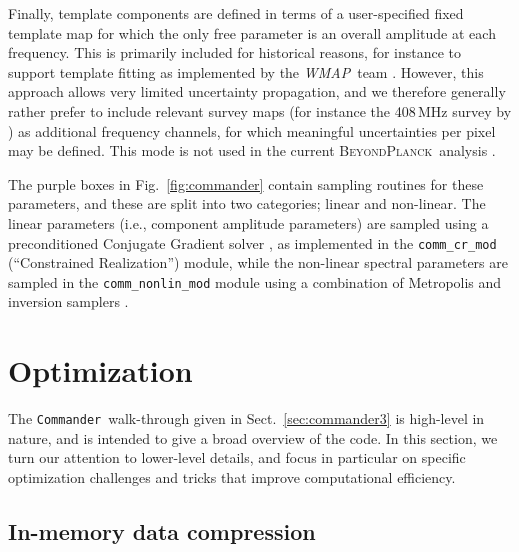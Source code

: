 \documentclass[twocolumn]{aa}
\def\WMAP{\emph{WMAP}}
\def\commander{\texttt{Commander}}
\newcommand{\BP}{\textsc{BeyondPlanck}}
\begin{document}
Finally, template components are defined in terms of a user-specified
fixed template map for which the only free parameter is an overall
amplitude at each frequency. This is primarily included for historical
reasons, for instance to support template fitting as implemented by
the \WMAP\ team \citep{bennett2012}. However, this approach allows
very limited uncertainty propagation, and we therefore generally
rather prefer to include relevant survey maps (for instance the
408\,MHz survey by \citealp{haslam1982}) as additional frequency
channels, for which meaningful uncertainties per pixel may be
defined. This mode is not used in the current \BP\ analysis
\citep{BP01}.

The purple boxes in Fig.~\ref{fig:commander} contain sampling routines
for these parameters, and these are split into two categories; linear
and non-linear. The linear parameters (i.e., component amplitude
parameters) are sampled using a preconditioned Conjugate Gradient
solver \citep{seljebotn:2019}, as implemented in the
\texttt{comm\_cr\_mod} (``Constrained Realization'') module, while the
non-linear spectral parameters are sampled in the
\texttt{comm\_nonlin\_mod} module using a combination of Metropolis
and inversion samplers \citep{BP13,BP14}.

\section{Optimization}
\label{sec:tricks}

The \commander\ walk-through given in Sect.~\ref{sec:commander3} is
high-level in nature, and is intended to give a broad overview of the
code. In this section, we turn our attention to lower-level details,
and focus in particular on specific optimization challenges and tricks
that improve computational efficiency.

\subsection{In-memory data compression}
\label{sec:compression}
\end{document}
